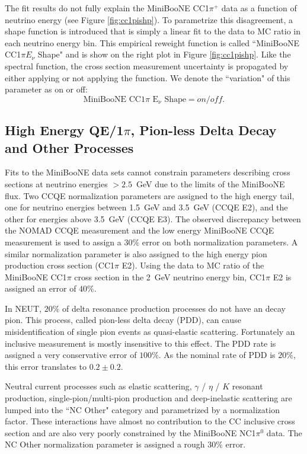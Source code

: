The fit results do not fully explain the MiniBooNE CC1$\pi^+$ data as a function of neutrino energy (see Figure \ref{fig:cc1pishp}). To parametrize this disagreement, a shape function is introduced that is simply a linear fit to the data to MC ratio in each neutrino energy bin. This empirical reweight function is called ``MiniBooNE CC1$\pi E_\nu$ Shape" and is show on the right plot in Figure \ref{fig:cc1pishp}. Like the spectral function, the cross section measurement uncertainty is propagated by either applying or not applying the function. We denote the ``variation" of this parameter as on or off:
\begin{equation}
\text{MiniBooNE CC1}\pi\text{~E}_\nu\text{~Shape} = on/off.
\end{equation}

\subsection{High Energy QE/1$\pi$, Pion-less Delta Decay and Other Processes}

Fits to the MiniBooNE data sets cannot constrain parameters describing cross sections at neutrino energies $>2.5$~GeV due to the limits of the MiniBooNE flux. Two CCQE normalization parameters are assigned to the high energy tail, one for neutrino energies between 1.5~GeV and 3.5~GeV (CCQE E2), and the other for energies above 3.5~GeV (CCQE E3). The observed discrepancy between the NOMAD CCQE measurement and the low energy MiniBooNE CCQE measurement is used to assign a $30\%$ error on both normalization parameters. A similar normalization parameter is also assigned to the high energy pion production cross section (CC1$\pi$ E2). Using the data to MC ratio of the MiniBooNE CC1$\pi$ cross section in the 2~GeV neutrino energy bin, CC1$\pi$ E2 is assigned an error of $40\%$.

In NEUT, $20\%$ of delta resonance production processes do not have an decay pion. This process, called pion-less delta decay (PDD), can cause misidentification of single pion events as quasi-elastic scattering. Fortunately an inclusive measurement is mostly insensitive to this effect. The PDD rate is assigned a very conservative error of $100\%$. As the nominal rate of PDD is $20\%$, this error translates to $0.2\pm0.2$.

Neutral current processes such as elastic scattering, $\gamma$ / $\eta$ / $K$ resonant production, single-pion/multi-pion production and deep-inelastic scattering are lumped into the ``NC Other" category and parametrized by a normalization factor. These interactions have almost no contribution to the CC inclusive cross section and are also very poorly constrained by the MiniBooNE NC1$\pi^0$ data. The NC Other normalization parameter is assigned a rough $30\%$ error. 

